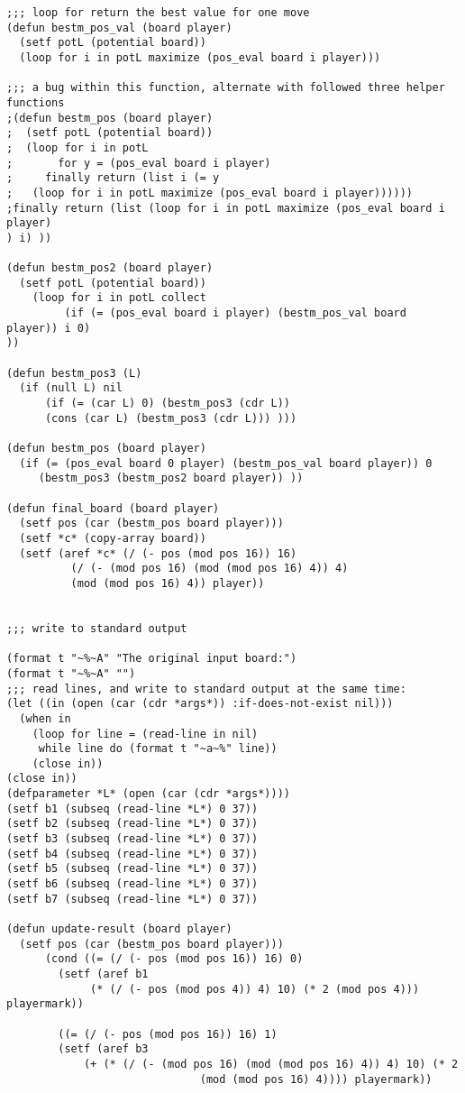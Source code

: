 \documentclass[12pt]{book}
\begin{document}
\begin{lstlisting}
;;; loop for return the best value for one move
(defun bestm_pos_val (board player)
  (setf potL (potential board))
  (loop for i in potL maximize (pos_eval board i player)))
    
;;; a bug within this function, alternate with followed three helper 
functions  
;(defun bestm_pos (board player)
;  (setf potL (potential board))
;  (loop for i in potL 
;       for y = (pos_eval board i player)
;     finally return (list i (= y
;   (loop for i in potL maximize (pos_eval board i player))))))
;finally return (list (loop for i in potL maximize (pos_eval board i player)
) i) ))

(defun bestm_pos2 (board player)
  (setf potL (potential board))
    (loop for i in potL collect 
         (if (= (pos_eval board i player) (bestm_pos_val board player)) i 0)
))

(defun bestm_pos3 (L)
  (if (null L) nil
      (if (= (car L) 0) (bestm_pos3 (cdr L)) 
      (cons (car L) (bestm_pos3 (cdr L))) )))

(defun bestm_pos (board player)
  (if (= (pos_eval board 0 player) (bestm_pos_val board player)) 0
     (bestm_pos3 (bestm_pos2 board player)) ))

(defun final_board (board player)
  (setf pos (car (bestm_pos board player)))
  (setf *c* (copy-array board))
  (setf (aref *c* (/ (- pos (mod pos 16)) 16)
          (/ (- (mod pos 16) (mod (mod pos 16) 4)) 4) 
          (mod (mod pos 16) 4)) player))


;;; write to standard output

(format t "~%~A" "The original input board:")
(format t "~%~A" "")
;;; read lines, and write to standard output at the same time:
(let ((in (open (car (cdr *args*)) :if-does-not-exist nil)))
  (when in
    (loop for line = (read-line in nil)
     while line do (format t "~a~%" line))
    (close in))
(close in))
(defparameter *L* (open (car (cdr *args*))))
(setf b1 (subseq (read-line *L*) 0 37))
(setf b2 (subseq (read-line *L*) 0 37))
(setf b3 (subseq (read-line *L*) 0 37))
(setf b4 (subseq (read-line *L*) 0 37))
(setf b5 (subseq (read-line *L*) 0 37))
(setf b6 (subseq (read-line *L*) 0 37))
(setf b7 (subseq (read-line *L*) 0 37))

(defun update-result (board player)
  (setf pos (car (bestm_pos board player)))
      (cond ((= (/ (- pos (mod pos 16)) 16) 0)
        (setf (aref b1
             (* (/ (- pos (mod pos 4)) 4) 10) (* 2 (mod pos 4))) playermark))

        ((= (/ (- pos (mod pos 16)) 16) 1) 
        (setf (aref b3 
            (+ (* (/ (- (mod pos 16) (mod (mod pos 16) 4)) 4) 10) (* 2 
                              (mod (mod pos 16) 4)))) playermark))


\end{lstlisting}
\end{document}
